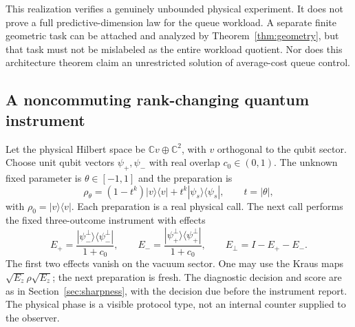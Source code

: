 This realization verifies a genuinely unbounded physical experiment. It does not prove a full predictive-dimension law for the queue workload. A separate finite geometric task can be attached and analyzed by Theorem~\ref{thm:geometry}, but that task must not be mislabeled as the entire workload quotient. Nor does this architecture theorem claim an unrestricted solution of average-cost queue control.

\subsection{A noncommuting rank-changing quantum instrument}
Let the physical Hilbert space be $\mathbb C v\oplus\mathbb C^2$, with $v$ orthogonal to the qubit sector. Choose unit qubit vectors $\psi_+,\psi_-$ with real overlap $c_0\in(0,1)$. The unknown fixed parameter is $\theta\in[-1,1]$ and the preparation is
\begin{equation}\label{eq:quantum-prep}
 \rho_\theta=(1-t^k)|v\rangle\langle v|
               +t^k|\psi_s\rangle\langle\psi_s|,
 \qquad t=|\theta|,
\end{equation}
with $\rho_0=|v\rangle\langle v|$. Each preparation is a real physical call. The next call performs the fixed three-outcome instrument with effects
\begin{equation}\label{eq:USD}
 E_+=\frac{|\psi_-^\perp\rangle\langle\psi_-^\perp|}{1+c_0},\qquad
 E_-=\frac{|\psi_+^\perp\rangle\langle\psi_+^\perp|}{1+c_0},\qquad
 E_\bot=I-E_+-E_-.
\end{equation}
The first two effects vanish on the vacuum sector. One may use the Kraus maps $\sqrt{E_z}\rho\sqrt{E_z}$; the next preparation is fresh. The diagnostic decision and score are as in Section~\ref{sec:sharpness}, with the decision due before the instrument report. The physical phase is a visible protocol type, not an internal counter supplied to the observer.

